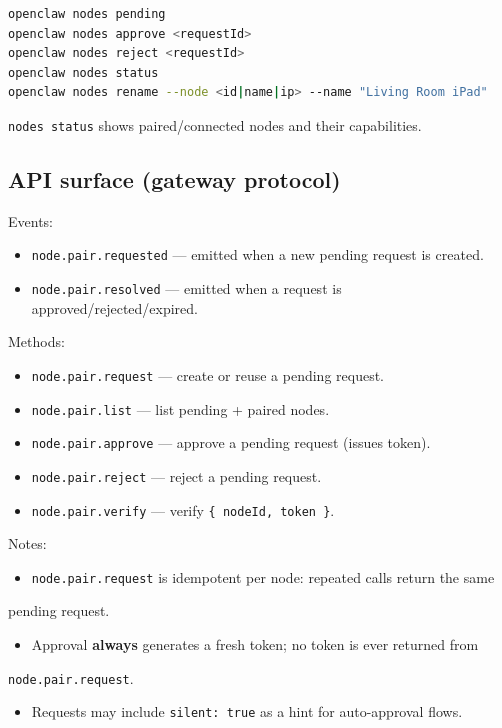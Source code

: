 \begin{lstlisting}[language=bash]
openclaw nodes pending
openclaw nodes approve <requestId>
openclaw nodes reject <requestId>
openclaw nodes status
openclaw nodes rename --node <id|name|ip> --name "Living Room iPad"
\end{lstlisting}


\texttt{nodes status} shows paired/connected nodes and their capabilities.

\subsection{API surface (gateway protocol)}


Events:

\begin{itemize}
  \item \texttt{node.pair.requested} — emitted when a new pending request is created.
  \item \texttt{node.pair.resolved} — emitted when a request is approved/rejected/expired.
\end{itemize}


Methods:

\begin{itemize}
  \item \texttt{node.pair.request} — create or reuse a pending request.
  \item \texttt{node.pair.list} — list pending + paired nodes.
  \item \texttt{node.pair.approve} — approve a pending request (issues token).
  \item \texttt{node.pair.reject} — reject a pending request.
  \item \texttt{node.pair.verify} — verify \texttt{\{ nodeId, token \}}.
\end{itemize}


Notes:

\begin{itemize}
  \item \texttt{node.pair.request} is idempotent per node: repeated calls return the same
\end{itemize}

pending request.
\begin{itemize}
  \item Approval \textbf{always} generates a fresh token; no token is ever returned from
\end{itemize}

\texttt{node.pair.request}.
\begin{itemize}
  \item Requests may include \texttt{silent: true} as a hint for auto-approval flows.
\end{itemize}


